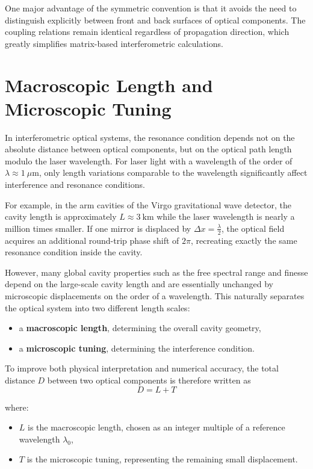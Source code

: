 \documentclass{report}
\begin{document}
One major advantage of the symmetric convention is that it avoids the need to distinguish explicitly between front and back surfaces of optical components. The coupling relations remain identical regardless of propagation direction, which greatly simplifies matrix-based interferometric calculations.

\section{Macroscopic Length and Microscopic Tuning}

In interferometric optical systems, the resonance condition depends not on the absolute distance between optical components, but on the optical path length modulo the laser wavelength. For laser light with a wavelength of the order of $\lambda \approx 1\ \mu\text{m}$, only length variations comparable to the wavelength significantly affect interference and resonance conditions.

For example, in the arm cavities of the Virgo gravitational wave detector, the cavity length is approximately  $L \approx 3\ \text{km}$ while the laser wavelength is nearly a million times smaller. If one mirror is displaced by $\Delta x = \frac{\lambda}{2}$, the optical field acquires an additional round-trip phase shift of $2\pi$, recreating exactly the same resonance condition inside the cavity.

However, many global cavity properties such as the free spectral range and finesse depend on the large-scale cavity length and are essentially unchanged by microscopic displacements on the order of a wavelength. This naturally separates the optical system into two different length scales:
\begin{itemize}
    \item a \textbf{macroscopic length}, determining the overall cavity geometry,
    \item a \textbf{microscopic tuning}, determining the interference condition.
\end{itemize}

To improve both physical interpretation and numerical accuracy, the total distance $D$ between two optical components is therefore written as
\begin{equation}
D = L + T
\end{equation}

where:

\begin{itemize}
    \item $L$ is the macroscopic length, chosen as an integer multiple of a reference wavelength $\lambda_0$,
    \item $T$ is the microscopic tuning, representing the remaining small displacement.
\end{itemize}
\end{document}
